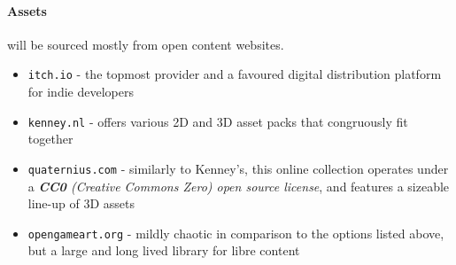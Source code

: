 \documentclass[12pt]{article}
\begin{document}
\paragraph{Assets} will be sourced mostly from open content websites. 
\begin{itemize}[label=\faSearch, noitemsep]
    \item \texttt{itch.io}\parencite*{itchio} - the topmost provider and a favoured digital distribution platform for indie developers
    \item \texttt{kenney.nl}\parencite*{kenney} - offers various 2D and 3D asset packs that congruously fit together
    \item \texttt{quaternius.com}\parencite*{quaternius} - similarly to Kenney's, this online collection operates under a \textit{\textbf{CC0} (Creative Commons Zero) open source license}, and features a sizeable line-up of 3D assets
    \item \texttt{opengameart.org}\parencite*{opengameart} - mildly chaotic in comparison to the options listed above, but a large and long lived library for libre content
\end{itemize}
\clearpage
\end{document}
